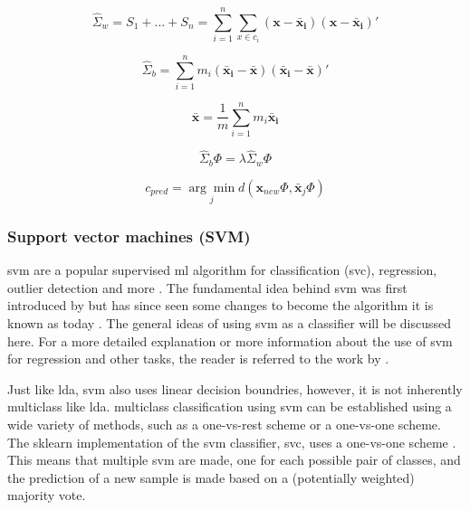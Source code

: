 \begin{equation}
    \label{eq:processing_signals_lda_intrascatter}
    \hat{\Sigma}_w = S_1 + ... + S_n = \sum^n_{i = 1} \sum_{x \in c_i} (\mathbf{x} - \mathbf{\bar{x}_i}) (\mathbf{x} - \mathbf{\bar{x}_i})'
\end{equation}

\begin{equation}
    \label{eq:processing_signals_lda_interscatter}
    \hat{\Sigma}_b = \sum^n_{i = 1} m_i (\mathbf{\bar{x}_i} - \mathbf{\bar{x}}) (\mathbf{\bar{x}_i} - \mathbf{\bar{x}})'
\end{equation}

\begin{equation}
    \label{eq:processing_signals_lda_total_mean}
    \mathbf{\bar{x}} = \frac{1}{m} \sum^n_{i = 1} m_i \mathbf{\bar{x}_i}
\end{equation}

\begin{equation}
    \label{eq:processing_signals_lda_linear_transform}
    \hat{\Sigma}_b \Phi = \lambda \hat{\Sigma}_w \Phi
\end{equation}

\begin{equation}
    \label{eq:processing_signals_lda_classificiation}
    c_{pred} = \underset{j}{\arg\min} d(\mathbf{x}_{new} \Phi, \mathbf{\bar{x}}_j \Phi)
\end{equation}


\subsubsection{Support vector machines (SVM)}
\label{subsubsec:processing_signals_ml_and_dl_ml_classifiers_svm}

\Gls{svm} are a popular supervised \gls{ml} algorithm for classification (\gls{svc}), regression, outlier detection and more \citep{svm_explained}.
The fundamental idea behind \gls{svm} was first introduced by \citet{first_svm} but has since seen some changes to become the algorithm it is known as today \citep{svm_history}.
The general ideas of using \gls{svm} as a classifier will be discussed here.
For a more detailed explanation or more information about the use of \gls{svm} for regression and other tasks, the reader is referred to the work by \citet{svm_explained}.

Just like \gls{lda}, \gls{svm} also uses linear decision boundries, however, it is not inherently multiclass like \gls{lda}.
multiclass classification using \gls{svm} can be established using a wide variety of methods, such as a one-vs-rest scheme or a one-vs-one scheme.
The \gls{sklearn} implementation of the \gls{svm} classifier, \gls{svc}, uses a one-vs-one scheme \citep{sklearn}.
This means that multiple \gls{svm} are made, one for each possible pair of classes, and the prediction of a new sample is made based on a (potentially weighted) majority vote.

